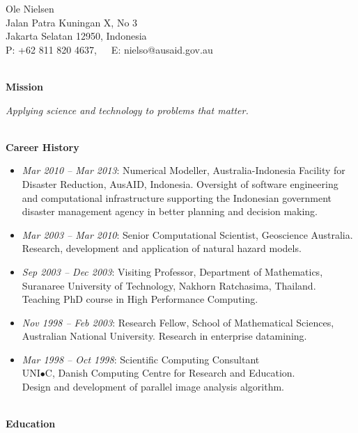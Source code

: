 \documentclass[11pt,a4paper]{article}
\begin{document}
\begin{center}
  Ole Nielsen \\
  Jalan Patra Kuningan X, No 3\\
  Jakarta Selatan 12950, Indonesia \\
  P: +62 811 820 4637,\ \ \ E: nielso@ausaid.gov.au
\end{center}

\begin{center}
  \hrulefill \\
  {\bf Mission} \\[-0.2cm]
  \hrulefill
\end{center}
\emph{Applying science and technology to problems that matter.}
\begin{center}
  \hrulefill \\
  {\bf Career History} \\[-0.2cm]
  \hrulefill
\end{center}

\begin{itemize}
\item {\em Mar 2010 -- Mar 2013}: Numerical Modeller, Australia-Indonesia Facility for Disaster Reduction, AusAID, Indonesia.
      Oversight of software engineering and computational infrastructure supporting the Indonesian government disaster management agency in better planning and decision making.
\item {\em Mar 2003 -- Mar 2010}: Senior Computational Scientist, Geoscience Australia.
      Research, development and application of natural hazard models.
\item {\em Sep 2003 -- Dec 2003}: Visiting Professor,
      Department of Mathematics,
      Suranaree University of Technology, Nakhorn Ratchasima, Thailand. Teaching PhD course in
      High Performance Computing.
\item {\em Nov 1998 -- Feb 2003}: Research Fellow,
      School of Mathematical Sciences, Australian National University.
      Research in enterprise datamining.
\item {\em Mar 1998 -- Oct 1998}: Scientific Computing Consultant \\
      UNI$\bullet$C, Danish Computing Centre for Research and Education.\\
      Design and development of parallel image analysis algorithm.
\end{itemize}



\begin{center}
  \hrulefill \\
  {\bf Education} \\[-0.2cm]
  \hrulefill
\end{center}
\end{document}
